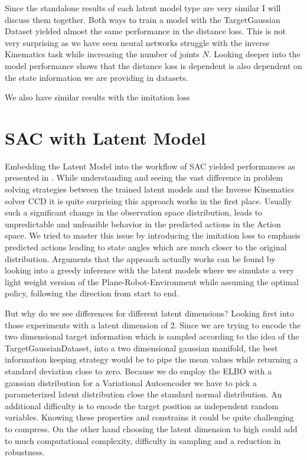 Since the standalone results of each latent model type are very similar I will discuss them together.
Both ways to train a model with the TargetGaussian Dataset yielded almost the same performance in the distance loss. This is not very surprising as we have seen neural networks struggle with the inverse Kinematics task while increasing the number of joints $N$. Looking deeper into the model performance shows that the distance loss is dependent is also dependent on the state information we are providing in datasets.    

We also have similar results with the imitation loss


\section{SAC with Latent Model}

Embedding the Latent Model into the workflow of SAC yielded performances as presented in . While understanding and seeing the vast difference in problem solving strategies between the trained latent models and the Inverse Kinematics solver CCD it is quite surprising this approach works in the first place. Usually such a significant change in the observation space distribution, leads to unpredictable and unfeasible behavior in the predicted actions in the Action space. We tried to master this issue by introducing the imitation loss to emphasis predicted actions leading to state angles which are much closer to the original distribution. Arguments that the approach actually works can be found by looking into a greedy inference with the latent models where we simulate a very light weight version of the Plane-Robot-Environment while assuming the optimal policy, following the direction from start to end.

But why do we see differences for different latent dimensions? Looking first into those experiments with a latent dimension of 2. Since we are trying to encode the two dimensional target information which is sampled according to the idea of the TargetGaussianDataset, into a two dimensional gaussian manifold, the best information keeping strategy would be to pipe the mean values while returning a standard deviation close to zero. Because we do employ the ELBO with a gaussian distribution for a Variational Autoencoder we have to pick a parameterized latent distribution close the standard normal distribution. An additional difficulty is to encode the target position as independent random variables. Knowing these properties and constrains it could be quite challenging to compress. On the other hand choosing the latent dimension to high could add to much computational complexity, difficulty in sampling and a reduction in robustness.

